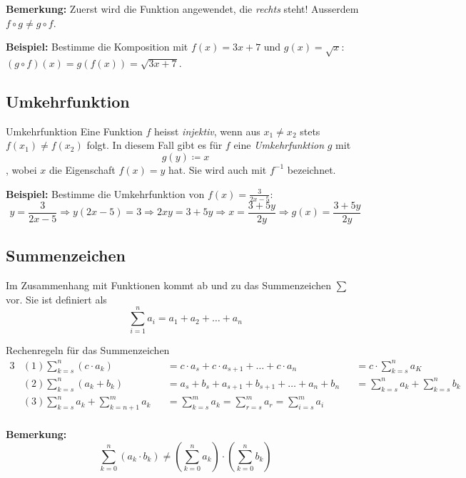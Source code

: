 \textbf{Bemerkung:} Zuerst wird die Funktion angewendet, die \emph{rechts} steht!
Ausserdem $f \circ g \neq g \circ f$.

\textbf{Beispiel:} Bestimme die Komposition mit $f(x) = 3x + 7$ und $g(x) = \sqrt{x}$: $(g \circ f)(x) = g(f(x)) = \sqrt{3x + 7}$.

\subsection{Umkehrfunktion}\label{subsec:umkehrfunktion}

\begin{definition}{Umkehrfunktion}
    Eine Funktion $f$ heisst \emph{injektiv}, wenn aus $x_1 \neq x_2$ stets $f(x_1) \neq f(x_2)$ folgt.
    In diesem Fall gibt es für $f$ eine \emph{Umkehrfunktion} $g$ mit \[g(y) \coloneqq x\], wobei $x$ die Eigenschaft $f(x) = y$ hat.
    Sie wird auch mit $f^{-1}$ bezeichnet.
\end{definition}

\textbf{Beispiel:} Bestimme die Umkehrfunktion von $f(x) = \frac{3}{2x-5}$: \[y = \frac{3}{2x-5} \Rightarrow y(2x-5) = 3 \Rightarrow 2xy = 3 + 5y \Rightarrow x = \frac{3 + 5y}{2y} \Rightarrow g(x) = \frac{3+5y}{2y}\]

\subsection{Summenzeichen}\label{subsec:summenzeichen}

Im Zusammenhang mit Funktionen kommt ab und zu das Summenzeichen $\sum$ vor.
Sie ist definiert als \[\sum_{i=1}^n a_i = a_1 + a_2 + \dots + a_n\]

\begin{definition}{Rechenregeln für das Summenzeichen}
    \begin{alignat*}{3}
        &(1) \sum_{k=s}^{n} (c \cdot a_k) &&= c \cdot a_s + c \cdot a_{s+1} + \dots + c \cdot a_n &&= c \cdot \sum_{k=s}^{n} a_K \\
        &(2) \sum_{k=s}^{n} (a_k + b_k) &&= a_s + b_s + a_{s+1} + b_{s+1} + \dots + a_n + b_n &&= \sum_{k=s}^{n} a_k + \sum_{k=s}^{n} b_k \\
        &(3) \sum_{k=s}^{n} a_k + \sum_{k = n + 1}^{m} a_k &&= \sum_{k = s}^{m} a_k = \sum_{r = s}^{m} a_r = \sum_{i = s}^{m} a_i \\
    \end{alignat*}
\end{definition}

\textbf{Bemerkung:} \[\sum_{k=0}^n (a_k \cdot b_k) \neq \left( \sum_{k=0}^n a_k \right) \cdot \left( \sum_{k=0}^n b_k \right)\]

